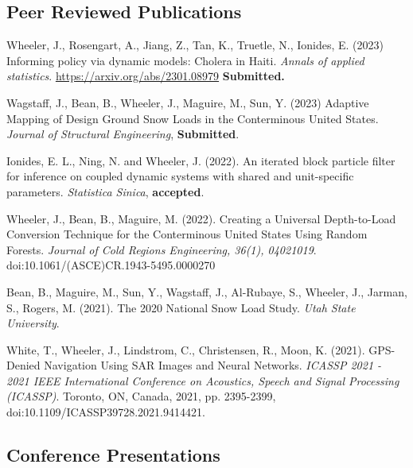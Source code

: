 \documentclass[11pt] {article}
\newenvironment {reflist}
                {
                 \begin{list}{}
                 {\setlength{\labelwidth}{0mm}
                  \setlength{\leftmargin}{8mm}
                  \setlength{\itemindent}{-3mm}
                  \setlength{\labelsep}{0mm}
                  \setlength{\parsep}{0.1 ex}
                  \setlength{\itemsep}{0.1cm}
      \setlength{\topsep}{0.15cm}}} %
   {\end{list}}
\begin{document}
\subsection*{Peer Reviewed Publications}

\begin{reflist}

    \item Wheeler, J., Rosengart, A., Jiang, Z., Tan, K., Truetle, N., Ionides, E. (2023) Informing policy via dynamic models: Cholera in Haiti. {\it Annals of applied statistics}. \url{https://arxiv.org/abs/2301.08979} \textbf{Submitted.} 

    \item Wagstaff, J., Bean, B., Wheeler, J., Maguire, M., Sun, Y. (2023) Adaptive Mapping of Design Ground Snow Loads in the Conterminous United States. {\it Journal of Structural Engineering}, \textbf{Submitted}.
  
    \item Ionides, E. L., Ning, N. and Wheeler, J. (2022). An iterated block particle filter for inference on coupled dynamic systems with shared and unit-specific parameters. {\it Statistica Sinica}, \textbf{accepted}.

    \item Wheeler, J., Bean, B., Maguire, M. (2022). Creating a Universal Depth-to-Load Conversion Technique for the Conterminous United States Using Random Forests. {\it Journal of Cold Regions Engineering, 36(1), 04021019}. doi:10.1061/(ASCE)CR.1943-5495.0000270

    \item Bean, B., Maguire, M., Sun, Y., Wagstaff, J., Al-Rubaye, S., Wheeler, J., Jarman, S., Rogers, M. (2021). The 2020 National Snow Load Study. {\it Utah State University}.

    \item White, T., Wheeler, J., Lindstrom, C., Christensen, R., Moon, K. (2021). GPS-Denied Navigation Using SAR Images and Neural Networks. {\it ICASSP 2021 - 2021 IEEE International Conference on Acoustics, Speech and Signal Processing (ICASSP)}. Toronto, ON, Canada, 2021, pp. 2395-2399, doi:10.1109/ICASSP39728.2021.9414421.
    
\end{reflist}

\subsection*{Conference Presentations}
\end{document}
